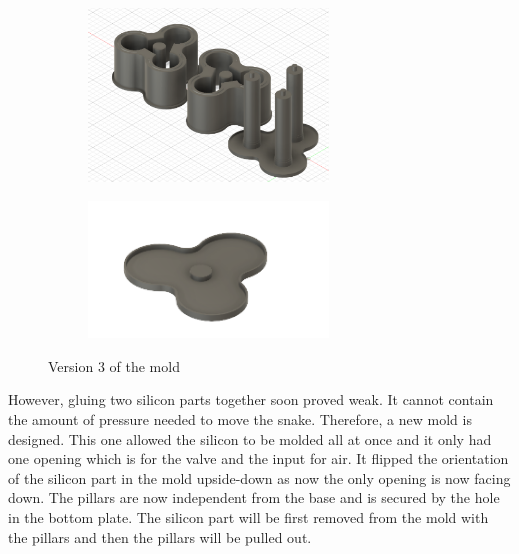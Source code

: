 \documentclass[twoside, 11pt]{article}
\begin{document}
\begin{figure} [H]
\centering
\begin{subfigure}[b]{0.5\linewidth}
		\centering
		\includegraphics[width=0.7\textwidth]{mold_v3}
	\end{subfigure}%
	\begin{subfigure}[b]{0.5\linewidth}
		\centering		
		\includegraphics[width=0.7\textwidth]{sealing_v3}
	\end{subfigure}
\caption{Version 3 of the mold}
\end{figure}

However, gluing two silicon parts together soon proved weak. It cannot contain the amount of pressure needed to move the snake. Therefore, a new mold is designed. This one allowed the silicon to be molded all at once and it only had one opening which is for the valve and the input for air. It flipped the orientation of the silicon part in the mold upside-down as now the only opening is now facing down. The pillars are now independent from the base and is secured by the hole in the bottom plate. The silicon part will be first removed from the mold with the pillars and then the pillars will be pulled out.
\end{document}

